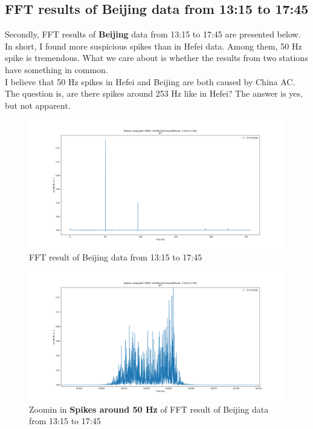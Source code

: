 \documentclass[
11pt, %
a4paper %
]{article}%
\theoremstyle{plain}
\begin{document}
\subsection{FFT results of \textbf{Beijing} data from 13:15 to 17:45}
Secondly, FFT results of \textbf{Beijing} data from 13:15 to 17:45 are presented below. In short, I found more suspicious spikes than in Hefei data. Among them, 50 Hz spike is tremendous. What we care about is whether the results from two stations have something in common. \\
I believe that 50 Hz spikes in Hefei and Beijing are both caused by China AC. The question is, are there spikes around 253 Hz like in Hefei? The answer is yes, but not apparent. \\
\newpage
\begin{figure}[ht]
	\centering
	\includegraphics[width=\textwidth]{beijing2.png}
	\caption{FFT result of Beijing data from 13:15 to 17:45}
	\label{fig:beijing2}
\end{figure}
\begin{figure}[ht]
	\centering
	\includegraphics[width=\textwidth]{beijing2_0.png}
	\caption{Zoomin in \textbf{Spikes around 50 Hz} of FFT result of Beijing data from 13:15 to 17:45}
	\label{fig:beijing2_0}
\end{figure}
\end{document}
